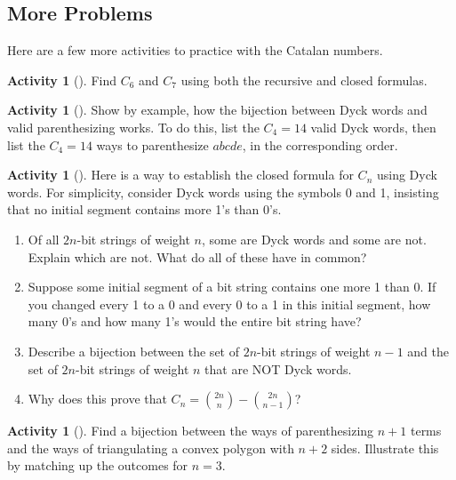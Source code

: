 \documentclass[10pt,]{book}
\theoremstyle{plain}
\theoremstyle{definition}
\theoremstyle{definition}
\theoremstyle{definition}
\newtheorem{activity}[project]{Activity}
\numberwithin{equation}{chapter}
\begin{document}
\subsection[{More Problems}]{More Problems}\label{subsec-catalanproblems}
\hypertarget{p-1042}{}%
Here are a few more activities to practice with the Catalan numbers.%
\begin{activity}[]\label{activity-177}
\hypertarget{p-1043}{}%
Find \(C_6\) and \(C_7\) using both the recursive and closed formulas.%
\end{activity}
\begin{activity}[]\label{activity-178}
\hypertarget{p-1044}{}%
Show by example, how the bijection between Dyck words and valid parenthesizing works.  To do this, list the \(C_4 = 14\) valid Dyck words, then list the \(C_4 = 14\) ways to parenthesize \(abcde\), in the corresponding order.%
\end{activity}
\begin{activity}[]\label{activity-179}
\hypertarget{p-1045}{}%
Here is a way to establish the closed formula for \(C_n\) using Dyck words.  For simplicity, consider Dyck words using the symbols 0 and 1, insisting that no initial segment contains more 1's than 0's.%
\begin{enumerate}[font=\bfseries,label=(\alph*),ref=\alph*]
\item\label{task-199} \hypertarget{p-1046}{}%
Of all \(2n\)-bit strings of weight \(n\), some are Dyck words and some are not.  Explain which are not.  What do all of these have in common?%
\item\label{task-200} \hypertarget{p-1047}{}%
Suppose some initial segment of a bit string contains one more 1 than 0.  If you changed every 1 to a 0 and every 0 to a 1 in this initial segment, how many 0's and how many 1's would the entire bit string have?%
\item\label{task-201} \hypertarget{p-1048}{}%
Describe a bijection between the set of \(2n\)-bit strings of weight \(n-1\) and the set of \(2n\)-bit strings of weight \(n\) that are NOT Dyck words.%
\item\label{task-202} \hypertarget{p-1049}{}%
Why does this prove that \(C_n = \binom{2n}{n} - \binom{2n}{n-1}\)?%
\end{enumerate}
\end{activity}
\begin{activity}[]\label{activity-180}
\hypertarget{p-1050}{}%
Find a bijection between the ways of parenthesizing \(n+1\) terms and the ways of triangulating a convex polygon with \(n+2\) sides.  Illustrate this by matching up the outcomes for \(n = 3\).%
\end{activity}
\end{document}
